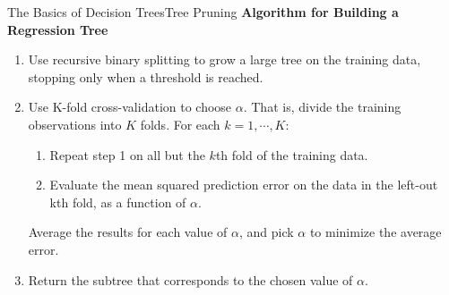 \begin{frame}{The Basics of Decision Trees}{Tree Pruning}
    \textbf{Algorithm for Building a Regression Tree}

    \begin{enumerate}
        \item Use recursive binary splitting to grow a large tree on the training data, stopping only when a threshold is reached. \pause 

        \item Use K-fold cross-validation to choose $\alpha$. That is, divide the training observations into $K$ folds. For each $k = 1, \cdots , K$: \pause

        \begin{enumerate}[a]
            \item Repeat step 1 on all but the $k$th fold of the training data. \pause

            \item Evaluate the mean squared prediction error on the data in the left-out kth fold, as a function of $\alpha$. \pause
        \end{enumerate}

        Average the results for each value of $\alpha$, and pick $\alpha$ to minimize the average error. \pause

        \item Return the subtree that corresponds to the chosen value of $\alpha$.
        
    \end{enumerate}
\end{frame}

